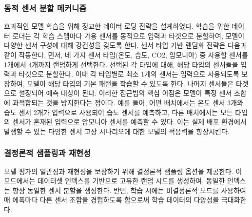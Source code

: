 \documentclass[final,5p,times,twocolumn,authoryear]{elsarticle}
\begin{document}
\subsubsection{동적 센서 분할 메커니즘}
효과적인 모델 학습을 위해 정교한 데이터 로딩 전략을 설계하였다. 학습을 위한 데이터 로더는 각 학습 스텝마다 가용 센서를 동적으로 입력과 타겟으로 분할하여, 모델이 다양한 센서 구성에 대해 강건성을 갖도록 한다.
센서 타입 기반 랜덤화 전략은 다음과 같이 작동한다. 먼저, 네 가지 센서 타입(온도, 습도, CO2, 암모니아) 중 사용할 센서를 1개에서 4개까지 랜덤하게 선택한다. 선택된 각 타입에 대해, 해당 타입의 센서들을 입력과 타겟으로 분할한다. 이때 각 타입별로 최소 1개의 센서는 입력으로 사용되도록 보장하여, 모델이 해당 타입의 기본 패턴을 학습할 수 있도록 한다. 나머지 센서들은 타겟으로 설정되어 예측 대상이 된다.
이러한 접근법의 핵심 이점은 모델이 특정 센서 조합에 과적합되는 것을 방지한다는 점이다. 예를 들어, 어떤 배치에서는 온도 센서 3개와 습도 센서 2개가 입력으로 사용되어 습도 센서를 예측하고, 다른 배치에서는 모든 타입의 센서가 혼재된 입력으로 암모니아 센서를 예측할 수 있다. 이는 실제 배포 환경에서 발생할 수 있는 다양한 센서 고장 시나리오에 대한 모델의 적응력을 향상시킨다.

\subsubsection{결정론적 샘플링과 재현성}
모델 평가의 일관성과 재현성을 보장하기 위해 결정론적 샘플링 옵션을 제공한다. 이 모드에서는 데이터셋 인덱스를 기반으로 고유한 랜덤 시드를 생성하여, 동일한 인덱스는 항상 동일한 센서 분할을 생성한다. 반면, 학습 시에는 비결정론적 모드를 사용하여 매 에폭마다 다른 센서 조합을 경험하도록 함으로써 학습 데이터의 다양성을 극대화한다.
\end{document}
